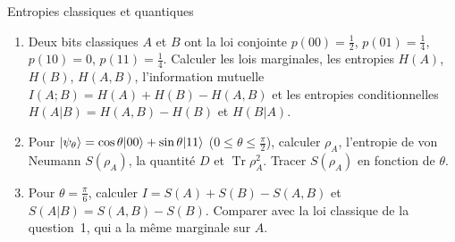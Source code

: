 \begin{exercice}{Entropies classiques et quantiques}\label{ex:entropies}
\begin{enumerate}[label=\arabic*.,nosep]
  \item Deux bits classiques $A$ et $B$ ont la loi conjointe
        $p(00)=\frac12$, $p(01)=\frac14$, $p(10)=0$, $p(11)=\frac14$. Calculer les lois marginales, les
        entropies $H(A)$, $H(B)$, $H(A,B)$, l'information mutuelle $I(A;B)=H(A)+H(B)-H(A,B)$ et les
        entropies conditionnelles $H(A|B)=H(A,B)-H(B)$ et $H(B|A)$.
  \item Pour $|\psi_\theta\rangle=\cos\theta|00\rangle+\sin\theta|11\rangle$ ($0\le\theta\le\frac\pi2$), calculer
        $\rho_A$, l'entropie de von Neumann $S(\rho_A)$, la quantité $D$ et $\operatorname{Tr}\rho_A^2$.
        Tracer $S(\rho_A)$ en fonction de $\theta$.
  \item Pour $\theta=\frac\pi6$, calculer $I=S(A)+S(B)-S(A,B)$ et $S(A|B)=S(A,B)-S(B)$. Comparer avec la
        loi classique de la question~1, qui a la même marginale sur $A$.
\end{enumerate}
\end{exercice}
